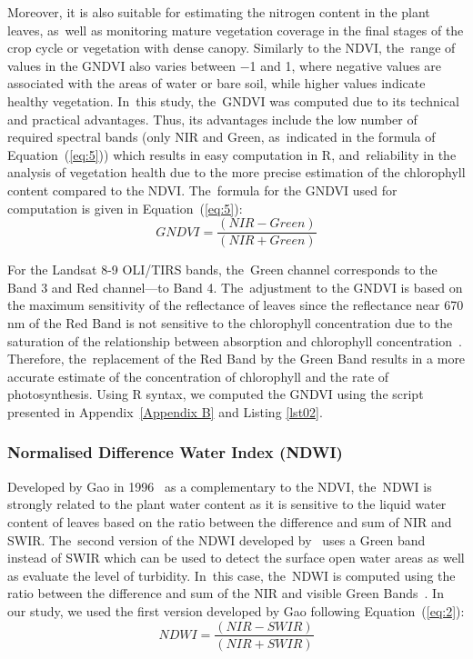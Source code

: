\documentclass[jimaging,article,accept,pdftex,moreauthors]{Definitions/mdpi}
\begin{document}
Moreover, it is also suitable for estimating the nitrogen content in the plant leaves, as~well as monitoring mature vegetation coverage in the final stages of the crop cycle or vegetation with dense canopy. Similarly to the NDVI, the~range of values in the GNDVI also varies between $-$1 and 1, where negative values are associated with the areas of water or bare soil, while higher values indicate healthy vegetation. In~this study, the~GNDVI was computed due to its technical and practical advantages. Thus, its advantages include the low number of required spectral bands (only NIR and Green, as~indicated in the formula of Equation~(\ref{eq:5})) which results in easy computation in R, and~reliability in the analysis of vegetation health due to the more precise estimation of the chlorophyll content compared to the NDVI. The~formula for the GNDVI used for computation is given in Equation~(\ref{eq:5}):
\begin{equation}\label{eq:5}
	GNDVI=\dfrac{(NIR-Green)}{(NIR+Green)}
\end{equation}

For the Landsat 8-9 OLI/TIRS bands, the~Green channel corresponds to the Band 3 and Red channel---to Band 4. The~adjustment to the GNDVI is based on the maximum sensitivity of the reflectance of leaves since the reflectance near 670 nm of the Red Band is not sensitive to the chlorophyll concentration due to the saturation of the relationship between absorption and chlorophyll concentration~\cite{GITELSON1996289}. Therefore, the~replacement of the Red Band by the Green Band results in a more accurate estimate of the concentration of chlorophyll and the rate of photosynthesis. Using R syntax, we computed the GNDVI using the script presented in Appendix~\ref{Appendix B} and Listing \ref{lst02}. 

\subsubsection{Normalised Difference Water Index (NDWI)}

Developed by Gao in 1996~\cite{GAO1996257} as a complementary to the NDVI, the~NDWI is strongly related to the plant water content as it is sensitive to the liquid water content of leaves based on the ratio between the difference and sum of NIR and SWIR. The~second version of the NDWI developed by~\cite{rs5073544} uses a Green band instead of SWIR which can be used to detect the surface open water areas as well as evaluate the level of turbidity. In~this case, the~NDWI is computed using the ratio between the difference and sum of the NIR and visible Green Bands~\cite{ZHENG2021129488}. In our study, we used the first version developed by Gao following Equation~(\ref{eq:2}):
\begin{equation}\label{eq:2}
	NDWI=\dfrac{(NIR-SWIR)}{(NIR+SWIR)}
\end{equation}
\end{document}
